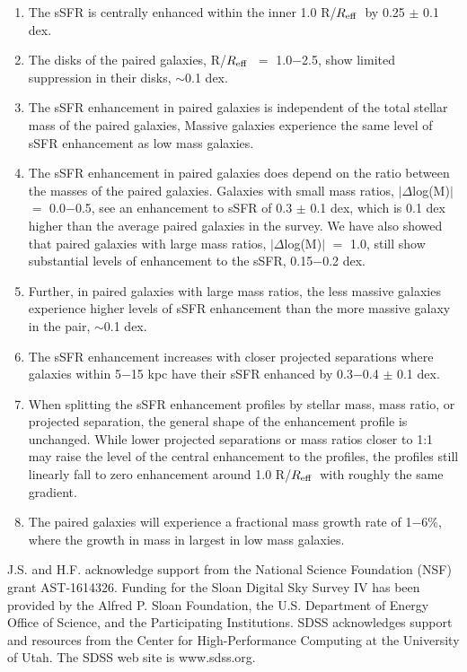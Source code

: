 \documentclass[iop,revtex4,twocolumn,apj,numberedappendix,appendixfloats]{emulateapj}
\newcommand{\reff}{$R_{\rm eff}$}
\begin{document}
\begin{enumerate}
\item The sSFR is centrally enhanced within the inner 1.0 R/\reff\ by 0.25 $\pm$ 0.1 dex. 
\item The disks of the paired galaxies, R/\reff\ $=$ 1.0$-$2.5, show limited suppression in their disks, $\sim$0.1 dex.
\item The sSFR enhancement in paired galaxies is independent of the total stellar mass of the paired galaxies, Massive galaxies experience the same level of sSFR enhancement as low mass galaxies.
\item The sSFR enhancement in paired galaxies does depend on the ratio between the masses of the paired galaxies. Galaxies with small mass ratios, $|\Delta$log(M)$|$ $=$ 0.0$-$0.5, see an enhancement to sSFR of 0.3 $\pm$ 0.1 dex, which is 0.1 dex higher than the average paired galaxies in the survey. We have also showed that paired galaxies with large mass ratios, $|\Delta$log(M)$|$ $=$ 1.0, still show substantial levels of enhancement to the sSFR, 0.15$-$0.2 dex. 
\item Further, in paired galaxies with large mass ratios, the less massive galaxies experience higher levels of sSFR enhancement than the more massive galaxy in the pair, $\sim$0.1 dex.
\item The sSFR enhancement increases with closer projected separations where galaxies within 5$-$15 kpc have their sSFR enhanced by 0.3$-$0.4 $\pm$ 0.1 dex. 
\item When splitting the sSFR enhancement profiles by stellar mass, mass ratio, or projected separation, the general shape of the enhancement profile is unchanged. While lower projected separations or mass ratios closer to 1:1 may raise the level of the central enhancement to the profiles, the profiles still linearly fall to zero enhancement around 1.0 R/\reff\ with roughly the same gradient.
\item The paired galaxies will experience a fractional mass growth rate of 1$-$6\%, where the growth in mass in largest in low mass galaxies.

\end{enumerate}

\acknowledgments

J.S. and H.F. acknowledge support from the National Science Foundation (NSF) grant AST-1614326. Funding for the Sloan Digital Sky Survey IV has been provided by the Alfred P. Sloan Foundation, the U.S. Department of Energy Office of Science, and the Participating Institutions. SDSS acknowledges support and resources from the Center for High-Performance Computing at the University of Utah. The SDSS web site is www.sdss.org.
\end{document}
